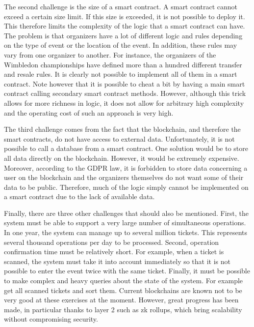 \documentclass[a4paper,11pt,oneside]{report}
\begin{document}
The second challenge is the size of a smart contract. A smart contract cannot exceed a certain size limit. If this size is exceeded, it is not possible to deploy it. This therefore limits the complexity of the logic that a smart contract can have. The problem is that organizers have a lot of different logic and rules depending on the type of event or the location of the event. In addition, these rules may vary from one organizer to another. For instance, the organizers of the Wimbledon championships have defined more than a hundred different transfer and resale rules. It is clearly not possible to implement all of them in a smart contract. Note however that it is possible to cheat a bit by having a main smart contract calling secondary smart contract methods. However, although this trick allows for more richness in logic, it does not allow for arbitrary high complexity and the operating cost of such an approach is very high.

The third challenge comes from the fact that the blockchain, and therefore the smart contracts, do not have access to external data. Unfortunately, it is not possible to call a database from a smart contract. One solution would be to store all data directly on the blockchain. However, it would be extremely expensive. Moreover, according to the GDPR law, it is forbidden to store data concerning a user on the blockchain and the organizers themselves do not want some of their data to be public. Therefore, much of the logic simply cannot be implemented on a smart contract due to the lack of available data.

Finally, there are three other challenges that should also be mentioned. First, the system must be able to support a very large number of simultaneous operations. In one year, the system can manage up to several million tickets. This represents several thousand operations per day to be processed. Second, operation confirmation time must be relatively short. For example, when a ticket is scanned, the system must take it into account immediately so that it is not possible to enter the event twice with the same ticket. Finally, it must be possible to make complex and heavy queries about the state of the system. For example get all scanned tickets and sort them. Current blockchains are known not to be very good at these exercises at the moment. However, great progress has been made, in particular thanks to layer 2 such as zk rollups, which bring scalability without compromising security.
\end{document}
